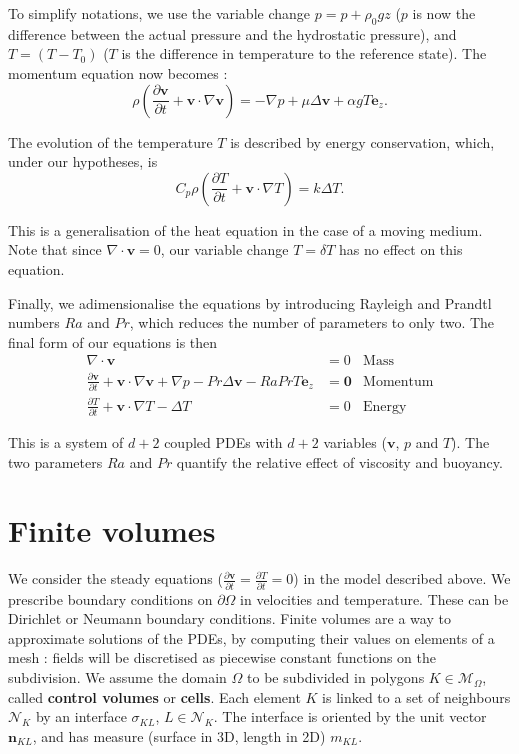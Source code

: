 \documentclass[12pt]{article}
\newcommand{\vb}[1]{\ensuremath{\boldsymbol #1}}
\begin{document}
To simplify notations, we use the variable change $p = p + \rho_0 g z$
($p$ is now the difference between the actual pressure and the
hydrostatic pressure), and $T = (T - T_0)$ ($T$ is the difference in
temperature to the reference state). The momentum equation now becomes
:
\begin{equation}
  \label{ns-mom}
  \rho \left(\frac{\partial \vb{v}}{\partial t} + \vb{v} \cdot
    \nabla \vb{v}\right) = -\nabla p + \mu \Delta \vb{v} + \alpha g
  T \vb{e_z}.
\end{equation}

The evolution of the temperature $T$ is described by energy
conservation, which, under our hypotheses, is
\begin{equation}
  C_p \rho \left(\frac{\partial T}{\partial t} + \vb{v} \cdot \nabla T\right) = k \Delta T.
\end{equation}

This is a generalisation of the heat equation in the case of a moving
medium. Note that since $\nabla \cdot \vb{v} = 0$, our variable change
$T = \delta T$ has no effect on this equation.

Finally, we adimensionalise the equations by introducing Rayleigh and
Prandtl numbers $Ra$ and $Pr$, which reduces the number of parameters
to only two. The final form of our equations is then
\begin{align}
  \label{b-mass}
  \nabla \cdot \vb{v} &= 0& \text{Mass}\\
  \label{b-mom}
  \frac{\partial \vb{v}}{\partial t} + \vb{v} \cdot
  \nabla \vb{v} +\nabla p - Pr \Delta \vb{v} - Ra Pr T
  \vb{e_z} &= \vb{0}& \text{Momentum}\\
  \label{b-ene}
  \frac{\partial T}{\partial t} + \vb{v} \cdot \nabla T - \Delta
  T&=0& \text{Energy}
\end{align}

This is a system of $d + 2$ coupled PDEs with $d+2$ variables
($\vb{v}$, $p$ and $T$). The two parameters $Ra$ and $Pr$ quantify the
relative effect of viscosity and buoyancy.

\section{Finite volumes}
We consider the steady equations ($\frac{\partial \vb{v}}{\partial t}
= \frac{\partial T}{\partial t} = 0$) in the model described above. We
prescribe boundary conditions on $\partial \Omega$ in velocities and
temperature. These can be Dirichlet or Neumann boundary
conditions. Finite volumes are a way to approximate solutions of the
PDEs, by computing their values on elements of a mesh : fields will be
discretised as piecewise constant functions on the subdivision. We
assume the domain $\Omega$ to be subdivided in polygons $K \in
\mathcal{M}_\Omega$, called {\bf control volumes} or {\bf cells}. Each element $K$ is
linked to a set of neighbours $\mathcal{N}_K$ by an interface
$\sigma_{KL}$, $L \in \mathcal N_K$. The interface is oriented by the
unit vector $\vb{n}_{KL}$, and has measure (surface in 3D, length in
2D) $m_{KL}$.
\end{document}
